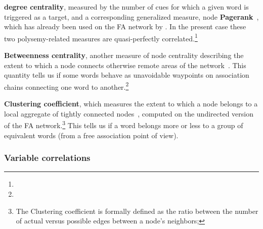 \begin{APAitemize}

    \item \textbf{ degree centrality}, measured by the number of cues for which a given word is triggered as a target, and a corresponding generalized measure, node \textbf{Pagerank}~\citep{page_pagerank_1999}, which has already been used on the FA network by \citet{griffiths_google_2007}.
    In the present case these two polysemy-related measures are quasi-perfectly correlated.\footnote{
    }

    \item \textbf{Betweenness centrality}, another measure of node centrality describing the extent to which a node connects otherwise remote areas of the network~\citep{freeman_set_1977}.
    This quantity tells us if some words behave as unavoidable waypoints on association chains connecting one word to another.\footnote{
    }

    \item \textbf{Clustering coefficient}, which measures the extent to which a node belongs to a local aggregate of tightly connected nodes~\citep{watts_collective_1998}, computed on the undirected  version of the FA network.\footnote{The Clustering coefficient is formally defined as the ratio between the number of actual versus possible edges between a node's neighbors;
    }
    This tells us if a word belongs more or less to a group of equivalent words (from a free association point of view).

\end{APAitemize}

\subsubsection{Variable correlations}

